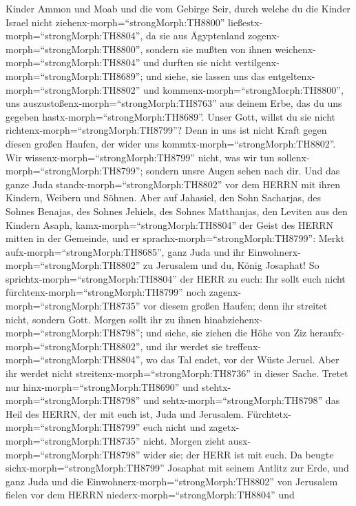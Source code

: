 Kinder Ammon und Moab und die vom Gebirge Seir, durch welche du die
Kinder Israel nicht ziehenx-morph=``strongMorph:TH8800''
ließestx-morph=``strongMorph:TH8804'', da sie aus Ägyptenland
zogenx-morph=``strongMorph:TH8800'', sondern sie mußten von ihnen
weichenx-morph=``strongMorph:TH8804'' und durften sie nicht
vertilgenx-morph=``strongMorph:TH8689'';  und siehe, sie
lassen uns das entgeltenx-morph=``strongMorph:TH8802'' und
kommenx-morph=``strongMorph:TH8800'', uns
auszustoßenx-morph=``strongMorph:TH8763'' aus deinem Erbe, das du uns
gegeben hastx-morph=``strongMorph:TH8689''.  Unser Gott,
willst du sie nicht richtenx-morph=``strongMorph:TH8799''? Denn in uns
ist nicht Kraft gegen diesen großen Haufen, der wider uns
kommtx-morph=``strongMorph:TH8802''. Wir
wissenx-morph=``strongMorph:TH8799'' nicht, was wir tun
sollenx-morph=``strongMorph:TH8799''; sondern unsre Augen sehen nach
dir.  Und das ganze Juda
standx-morph=``strongMorph:TH8802'' vor dem HERRN mit ihren Kindern,
Weibern und Söhnen.  Aber auf Jahasiel, den Sohn Sacharjas,
des Sohnes Benajas, des Sohnes Jehiels, des Sohnes Matthanjas, den
Leviten aus den Kindern Asaph, kamx-morph=``strongMorph:TH8804'' der
Geist des HERRN mitten in der Gemeinde,  und er
sprachx-morph=``strongMorph:TH8799'': Merkt
aufx-morph=``strongMorph:TH8685'', ganz Juda und ihr
Einwohnerx-morph=``strongMorph:TH8802'' zu Jerusalem und du, König
Josaphat! So sprichtx-morph=``strongMorph:TH8804'' der HERR zu euch: Ihr
sollt euch nicht fürchtenx-morph=``strongMorph:TH8799'' noch
zagenx-morph=``strongMorph:TH8735'' vor diesem großen Haufen; denn ihr
streitet nicht, sondern Gott.  Morgen sollt ihr zu ihnen
hinabziehenx-morph=``strongMorph:TH8798''; und siehe, sie ziehen die
Höhe von Ziz heraufx-morph=``strongMorph:TH8802'', und ihr werdet sie
treffenx-morph=``strongMorph:TH8804'', wo das Tal endet, vor der Wüste
Jeruel.  Aber ihr werdet nicht
streitenx-morph=``strongMorph:TH8736'' in dieser Sache. Tretet nur
hinx-morph=``strongMorph:TH8690'' und
stehtx-morph=``strongMorph:TH8798'' und
sehtx-morph=``strongMorph:TH8798'' das Heil des HERRN, der mit euch ist,
Juda und Jerusalem. Fürchtetx-morph=``strongMorph:TH8799'' euch nicht
und zagetx-morph=``strongMorph:TH8735'' nicht. Morgen zieht
ausx-morph=``strongMorph:TH8798'' wider sie; der HERR ist mit euch.
 Da beugte sichx-morph=``strongMorph:TH8799'' Josaphat mit
seinem Antlitz zur Erde, und ganz Juda und die
Einwohnerx-morph=``strongMorph:TH8802'' von Jerusalem fielen vor dem
HERRN niederx-morph=``strongMorph:TH8804'' und
